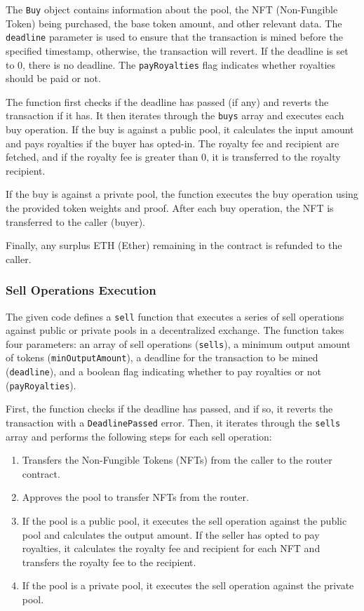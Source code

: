 The \texttt{Buy} object contains information about the pool, the NFT
(Non-Fungible Token) being purchased, the base token amount, and other
relevant data. The \texttt{deadline} parameter is used to ensure that
the transaction is mined before the specified timestamp, otherwise, the
transaction will revert. If the deadline is set to 0, there is no
deadline. The \texttt{payRoyalties} flag indicates whether royalties
should be paid or not.

The function first checks if the deadline has passed (if any) and
reverts the transaction if it has. It then iterates through the
\texttt{buys} array and executes each buy operation. If the buy is
against a public pool, it calculates the input amount and pays royalties
if the buyer has opted-in. The royalty fee and recipient are fetched,
and if the royalty fee is greater than 0, it is transferred to the
royalty recipient.

If the buy is against a private pool, the function executes the buy
operation using the provided token weights and proof. After each buy
operation, the NFT is transferred to the caller (buyer).

Finally, any surplus ETH (Ether) remaining in the contract is refunded
to the caller.

\hypertarget{sell-operations-execution}{%
\subsubsection{Sell Operations
Execution}\label{sell-operations-execution}}

The given code defines a \texttt{sell} function that executes a series
of sell operations against public or private pools in a decentralized
exchange. The function takes four parameters: an array of sell
operations (\texttt{sells}), a minimum output amount of tokens
(\texttt{minOutputAmount}), a deadline for the transaction to be mined
(\texttt{deadline}), and a boolean flag indicating whether to pay
royalties or not (\texttt{payRoyalties}).

First, the function checks if the deadline has passed, and if so, it
reverts the transaction with a \texttt{DeadlinePassed} error. Then, it
iterates through the \texttt{sells} array and performs the following
steps for each sell operation:

\begin{enumerate}
\def\labelenumi{\arabic{enumi}.}
\tightlist
\item
  Transfers the Non-Fungible Tokens (NFTs) from the caller to the router
  contract.
\item
  Approves the pool to transfer NFTs from the router.
\item
  If the pool is a public pool, it executes the sell operation against
  the public pool and calculates the output amount. If the seller has
  opted to pay royalties, it calculates the royalty fee and recipient
  for each NFT and transfers the royalty fee to the recipient.
\item
  If the pool is a private pool, it executes the sell operation against
  the private pool.
\end{enumerate}

